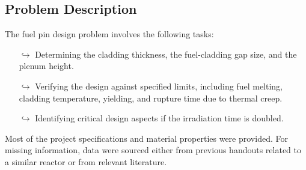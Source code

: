 \subsection{Problem Description}
The fuel pin design problem involves the following tasks:

\begin{itemize}
    \item[$\hookrightarrow$] Determining the cladding thickness, the fuel-cladding gap size, and the plenum height.
    \item[$\hookrightarrow$] Verifying the design against specified limits, including fuel melting, cladding temperature, yielding, and rupture time due to thermal creep.
    \item[$\hookrightarrow$] Identifying critical design aspects if the irradiation time is doubled.
\end{itemize}

Most of the project specifications and material properties were provided. For missing information, data were sourced either from previous handouts related to a similar reactor or from relevant literature.
